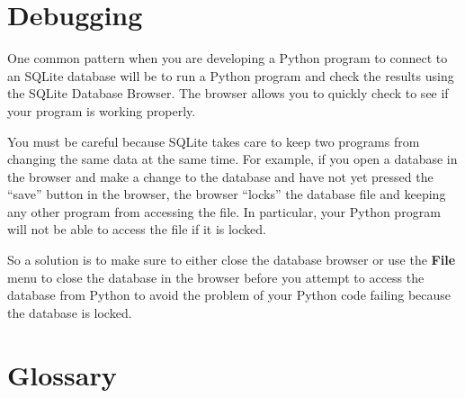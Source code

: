 \section{Debugging}

One common pattern when you are developing a Python program to connect to
an SQLite database will be to run a Python program and check the
results using the SQLite Database Browser.  The browser allows you 
to quickly check to see if your program is working properly.

You must be careful because SQLite takes care to keep two programs
from changing the same data at the same time.   For example, if
you open a database in the browser and make a change to the database
and have not yet pressed the ``save'' button in the browser, the 
browser ``locks'' the database file and keeping any other program
from accessing the file.  In particular, your Python program
will not be able to access the file if it is locked.

So a solution is to make sure to either close the database browser 
or use the {\bf File} menu to close the database in the browser
before you attempt to access the database from Python to avoid
the problem of your Python code failing because the database is
locked.

\section{Glossary}

